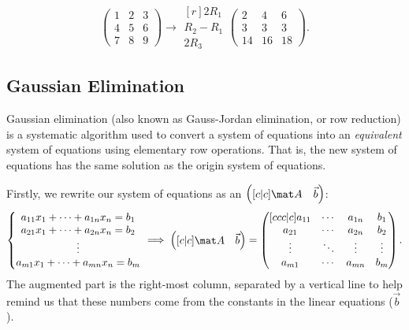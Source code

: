 \begin{example}
    \[\begin{pmatrix}1 & 2 & 3 \\ 4 & 5 & 6 \\ 7 & 8 & 9\end{pmatrix} \rightarrow \begin{matrix}[r] \scriptstyle 2R_1 \\ \scriptstyle R_2 - R_1 \\ \scriptstyle 2R_3\end{matrix} \begin{pmatrix}2 & 4 & 6 \\ 3 & 3 & 3 \\ 14 & 16 & 18\end{pmatrix}.\]
\end{example}

\subsection{Gaussian Elimination}

Gaussian elimination (also known as Gauss-Jordan elimination, or row reduction) is a systematic algorithm used to convert a system of equations into an \emph{equivalent} system of equations using elementary row operations. That is, the new system of equations has the same solution as the origin system of equations.

Firstly, we rewrite our system of equations as an  $\begin{pmatrix}[c|c]\mat A & \vec b\end{pmatrix}$: \[\left\{ \begin{matrix}a_{11} x_1 + \dots + a_{1n} x_n = b_1 \\ a_{21} x_1 + \dots + a_{2n} x_n = b_2 \\ \vdots \\ a_{m1} x_1 + \dots + a_{mn} x_n = b_m \end{matrix} \right. \implies \begin{pmatrix}[c|c]\mat A & \vec b\end{pmatrix} = \begin{pmatrix}[ccc|c] a_{11} & \cdots & a_{1n} & b_1 \\ a_{21} & \cdots & a_{2n} & b_2 \\ \vdots & \ddots & \vdots & \vdots \\ a_{m1} & \cdots & a_{mn} & b_m \end{pmatrix}.\] The augmented part is the right-most column, separated by a vertical line to help remind us that these numbers come from the constants in the linear equations ($\vec b$).

